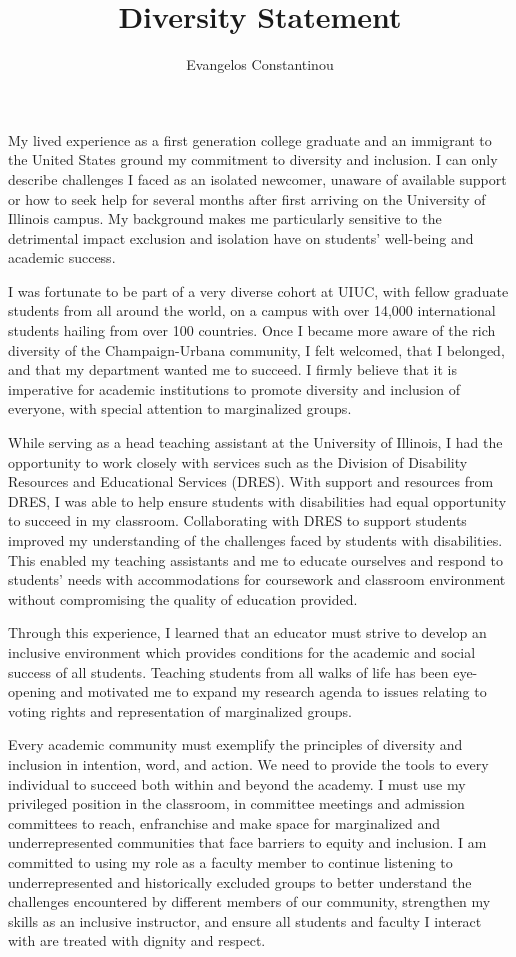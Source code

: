 \documentclass[11pt]{article}
\author{Evangelos Constantinou}
\date{}
\title{\bf{Diversity Statement}}
\begin{document}
\maketitle
My lived experience as a first generation college graduate and an immigrant to the United States ground my commitment to diversity and inclusion.
I can only describe challenges I faced as an isolated newcomer, unaware of available support or how to seek help for several months after first arriving on the University of Illinois campus.
My background makes me particularly sensitive to the detrimental impact exclusion and isolation have on students' well-being and academic success.

I was fortunate to be part of a very diverse cohort at UIUC, with fellow graduate students from all around the world, on a campus with over 14,000 international students hailing from over 100 countries.
Once I became more aware of the rich diversity of the Champaign-Urbana community, I felt welcomed, that I belonged, and that my department wanted me to succeed.
I firmly believe that it is imperative for academic institutions to promote diversity and inclusion of everyone, with special attention to marginalized groups. 

While serving as a head teaching assistant at the University of Illinois, I had the opportunity to work closely with services such as the Division of Disability Resources and Educational Services (DRES).
With support and resources from DRES, I was able to help ensure students with disabilities had equal opportunity to succeed in my classroom. 
Collaborating with DRES to support students improved my understanding of the challenges faced by students with disabilities.
This enabled my teaching assistants and me to educate ourselves and respond to students’ needs with accommodations for coursework and classroom environment without compromising the quality of education provided.

Through this experience, I learned that an educator must strive to develop an inclusive environment which provides conditions for the academic and social success of all students.
Teaching students from all walks of life has been eye-opening and motivated me to expand my research agenda to issues relating to voting rights and representation of marginalized groups.

Every  academic community must exemplify the principles of diversity and inclusion in intention, word, and action.
We need to provide the tools to every individual to succeed both within and beyond the academy.
I must use my privileged position in the classroom, in committee meetings and admission committees to reach, enfranchise and make space for marginalized and underrepresented communities that face barriers to equity and inclusion.
I am committed to using my role as a faculty member to continue listening to underrepresented and historically
excluded groups to better understand the challenges encountered by different members of our community,
strengthen my skills as an inclusive instructor, and ensure all students and faculty I interact with are treated with dignity and respect.
\end{document}
